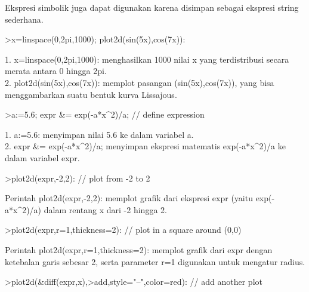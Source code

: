 \documentclass{article}
\begin{document}
\begin{eulernotebook}
\begin{eulercomment}
\begin{eulercomment}
\begin{eulercomment}
\begin{eulercomment}
\begin{eulercomment}
\begin{eulercomment}
\begin{eulercomment}
Ekspresi simbolik juga dapat digunakan karena disimpan sebagai
ekspresi string sederhana.
\end{eulercomment}
\begin{eulerprompt}
>x=linspace(0,2pi,1000); plot2d(sin(5x),cos(7x)):
\end{eulerprompt}
\begin{eulercomment}
1. x=linspace(0,2pi,1000): menghasilkan 1000 nilai x yang
terdistribusi secara merata antara 0 hingga 2pi.\\
2. plot2d(sin(5x),cos(7x)): memplot pasangan (sin(5x),cos(7x)), yang
bisa menggambarkan suatu bentuk kurva Lissajous.
\end{eulercomment}
\begin{eulerprompt}
>a:=5.6; expr &= exp(-a*x^2)/a; // define expression
\end{eulerprompt}
\begin{eulercomment}
1. a:=5.6: menyimpan nilai 5.6 ke dalam variabel a.\\
2. expr \&= exp(-a*x\textasciicircum{}2)/a; menyimpan ekspresi matematis exp(-a*x\textasciicircum{}2)/a
ke dalam variabel expr.
\end{eulercomment}
\begin{eulerprompt}
>plot2d(expr,-2,2): // plot from -2 to 2
\end{eulerprompt}
\begin{eulercomment}
Perintah plot2d(expr,-2,2): memplot grafik dari ekspresi expr (yaitu
exp(-a*x\textasciicircum{}2)/a) dalam rentang x dari -2 hingga 2.
\end{eulercomment}
\begin{eulerprompt}
>plot2d(expr,r=1,thickness=2): // plot in a square around (0,0)
\end{eulerprompt}
\begin{eulercomment}
Perintah plot2d(expr,r=1,thickness=2): memplot grafik dari expr dengan
ketebalan garis sebesar 2, serta parameter r=1 digunakan untuk
mengatur radius.
\end{eulercomment}
\begin{eulerprompt}
>plot2d(&diff(expr,x),>add,style="--",color=red): // add another plot
\end{eulerprompt}
\begin{eulercomment}

\end{eulercomment}
\end{eulercomment}
\end{eulercomment}
\end{eulercomment}
\end{eulercomment}
\end{eulercomment}
\end{eulercomment}
\end{eulernotebook}
\end{document}

